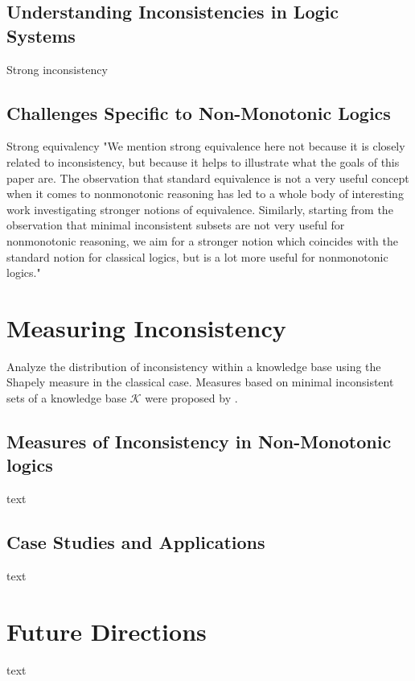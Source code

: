 \subsection{Understanding Inconsistencies in Logic Systems}
Strong inconsistency \cite{brewka_strong_2019}

\subsection{Challenges Specific to Non-Monotonic Logics}
Strong equivalency \cite{lifschitz_strongly_2001}
"We mention strong equivalence here not because it is closely related to inconsistency, but because it helps to illustrate what the goals of this paper are. The observation that standard equivalence is not a very useful concept when it comes to nonmonotonic reasoning has led to a whole body of interesting work investigating stronger notions of equivalence. Similarly, starting from the observation that minimal inconsistent subsets are not very useful for nonmonotonic reasoning, we aim for a stronger notion which coincides with the standard notion for classical logics, but is a lot more useful for nonmonotonic logics." \cite{brewka_strong_2019}

\section{Measuring Inconsistency}
Analyze the distribution of inconsistency within a knowledge base using the Shapely measure \cite{hunter_measure_2010} in the classical case.
Measures based on minimal inconsistent sets of a knowledge base \(\mathcal{K}\) \cite{jabbour_mis_2016} were proposed by \cite{ulbricht_measuring_2018}.

\subsection{Measures of Inconsistency in Non-Monotonic logics}
text

\subsection{Case Studies and Applications}
text

\section{Future Directions}
text
